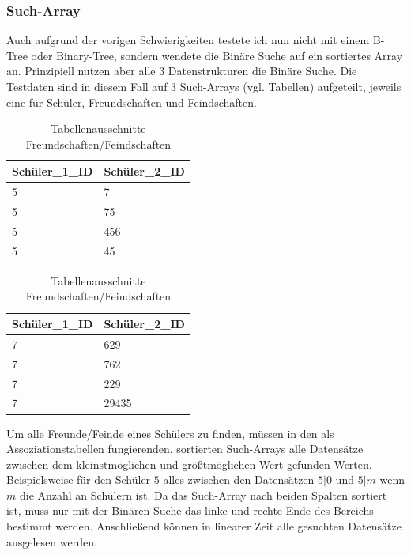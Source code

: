 \documentclass[11pt,a4paper]{article}
\begin{document}
\subsubsection{Such-Array}

Auch aufgrund der vorigen Schwierigkeiten testete ich nun nicht
mit einem B-Tree oder Binary-Tree, sondern wendete die Binäre Suche
auf ein sortiertes Array an. Prinzipiell nutzen aber alle 3 Datenstrukturen die
Binäre Suche. Die Testdaten sind in diesem Fall auf 3 Such-Arrays (vgl. Tabellen)
aufgeteilt, jeweils eine für Schüler, Freundschaften und Feindschaften.

\begin{table}[H]
    \centering
    \begin{tabular}{|l|l|}
        \hline
        Schüler\_1\_ID & Schüler\_2\_ID \\ \hline
        5          & 7          \\ \hline
        5        & 75         \\ \hline
        5        & 456        \\ \hline
        5       & 45         \\ \hline
    \end{tabular}
    \qquad
    \begin{tabular}{|l|l|}
        \hline
        Schüler\_1\_ID & Schüler\_2\_ID \\ \hline
        7          & 629          \\ \hline
        7        & 762         \\ \hline
        7        & 229        \\ \hline
        7       & 29435         \\ \hline
    \end{tabular}
    \caption{Tabellenausschnitte Freundschaften/Feindschaften}
\end{table}

Um alle Freunde/Feinde eines Schülers zu finden, müssen in
den als Assoziationstabellen fungierenden, sortierten Such-Arrays
alle Datensätze zwischen dem kleinstmöglichen und größtmöglichen Wert
gefunden Werten. Beispielsweise für den Schüler $5$ alles zwischen den Datensätzen
$5 | 0$ und $5 | m$ wenn $m$ die Anzahl an Schülern ist. Da das Such-Array
nach beiden Spalten sortiert ist, muss nur mit der Binären Suche das linke
und rechte Ende des Bereichs bestimmt werden. Anschließend können in linearer
Zeit alle gesuchten Datensätze ausgelesen werden.

\vspace*{0.5cm}
\end{document}
